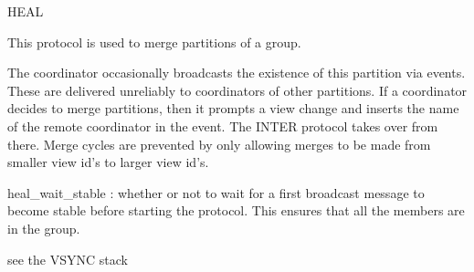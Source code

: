 %
%
%
\begin{Layer}{HEAL}

This protocol is used to merge partitions of a group.

\begin{Protocol}
The coordinator occasionally broadcasts the existence of this partition via
 events.  These are delivered unreliably to coordinators of other
partitions.  If a coordinator decides to merge partitions, then it prompts a
view change and inserts the name of the remote coordinator in the 
event.  The INTER protocol takes over from there.  Merge cycles are prevented
by only allowing merges to be made from smaller view id's to larger view id's.
\end{Protocol}

\begin{Parameters}
\item
heal\_wait\_stable : whether or not to wait for a first broadcast message to
become stable before starting the protocol.  This ensures that all the members
are in the group.
\end{Parameters}

\begin{Properties}
\item \todo{}
\end{Properties}

\begin{Sources}
\end{Sources}

\begin{GenEvent}
\end{GenEvent}

\begin{Testing}
\item see the VSYNC stack
\end{Testing}
\end{Layer}
